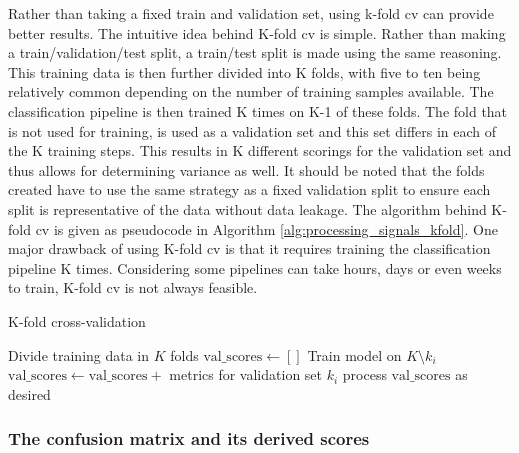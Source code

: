 Rather than taking a fixed train and validation set, using k-fold \gls{cv} can provide better results.
The intuitive idea behind K-fold \gls{cv} is simple.
Rather than making a train/validation/test split, a train/test split is made using the same reasoning.
This training data is then further divided into K folds, with five to ten being relatively common depending on the number of training samples available. 
The classification pipeline is then trained K times on K-1 of these folds.
The fold that is not used for training, is used as a validation set and this set differs in each of the K training steps.
This results in K different scorings for the validation set and thus allows for determining variance as well.
It should be noted that the folds created have to use the same strategy as a fixed validation split to ensure each split is representative of the data without data leakage.
The algorithm behind K-fold \gls{cv} is given as pseudocode in Algorithm \ref{alg:processing_signals_kfold}.
One major drawback of using K-fold \gls{cv} is that it requires training the classification pipeline K times.
Considering some pipelines can take hours, days or even weeks to train, K-fold \gls{cv} is not always feasible.

\begin{algorithm}
    \caption{K-fold cross-validation}
    \label{alg:processing_signals_kfold}
    \begin{algorithmic}
        \State Divide training data in $K$ folds 
        \State $\text{val\_scores} \gets []$ 
            \State Train model on $K \setminus k_i$
            \State $\text{val\_scores} \gets \text{val\_scores} + $ metrics for validation set $k_i$ 
        \EndFor
        \State process $\text{val\_scores}$ as desired
    \end{algorithmic}
\end{algorithm}



\subsubsection{The confusion matrix and its derived scores}
\label{subsubsec:processing_signals_evaluating_and_using_evaluation_cm} 

